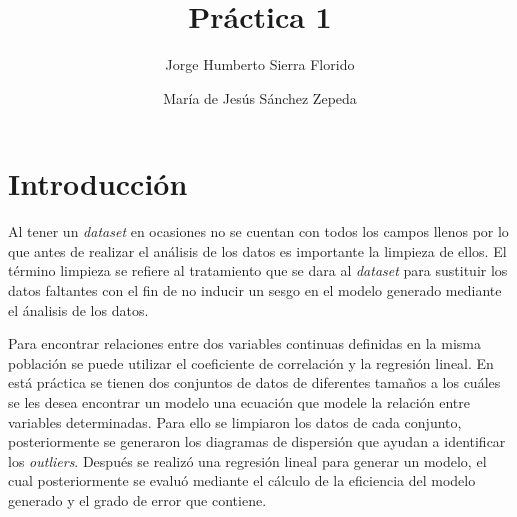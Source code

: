 \documentclass[sigconf]{acmart}
\begin{document}
	
	\title{Práctica 1}
	
	\author{Jorge Humberto Sierra Florido}
	
	\author{María de Jesús Sánchez Zepeda}
	
	\begin{abstract}
	\end{abstract}
	
	\maketitle
	
	\section{Introducción}
	
	Al tener un \textit{dataset} en ocasiones no se cuentan con todos los campos llenos por lo que antes de realizar el análisis de los datos es importante la limpieza de ellos. El término limpieza se refiere al tratamiento que se dara al \textit{dataset} para sustituir los datos faltantes con el fin de no inducir un sesgo en el modelo generado mediante el ánalisis de los datos.
	
	Para encontrar relaciones entre dos variables continuas definidas en la misma población se puede utilizar el coeficiente de correlación y la regresión lineal. En está práctica se tienen dos conjuntos de datos de diferentes tamaños a los cuáles se les desea encontrar un modelo una ecuación que modele la relación entre variables determinadas. Para ello se limpiaron los datos de cada conjunto, posteriormente se generaron los diagramas de dispersión que ayudan a identificar los \textit{outliers}. Después se realizó una regresión lineal para generar un modelo, el cual posteriormente se evaluó mediante el cálculo de la eficiencia del modelo generado y el grado de error que contiene.
	
\end{document}
